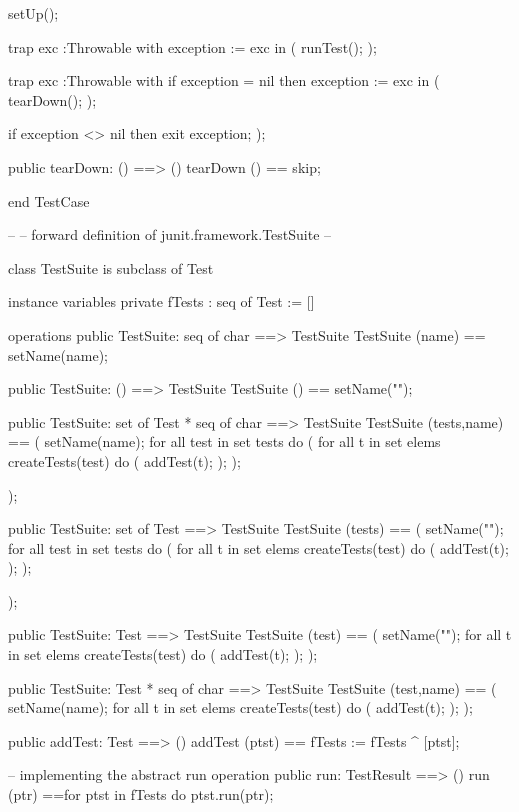 \documentclass[a4paper]{article}
\begin{document}
\begin{vdm_al}
    setUp();
    
    trap exc :Throwable
        with  
            exception := exc
        in
        (
            runTest();
        );

    trap exc :Throwable
        with  
            if exception = nil then
                exception := exc
        in
        (
            tearDown();
        );
        
    if exception <> nil then exit exception;
   );
  
  public tearDown: () ==> ()
  tearDown () == skip;
           
end TestCase

--
-- forward definition of junit.framework.TestSuite
--

class TestSuite is subclass of Test

instance variables
  private fTests : seq of Test := []
  
operations
  public TestSuite: seq of char ==> TestSuite
  TestSuite (name) == setName(name);

  public TestSuite: () ==> TestSuite
  TestSuite () == setName("");

  public TestSuite: set of Test * seq of char ==> TestSuite
  TestSuite (tests,name) == 
  (
    setName(name);
    for all test in set tests do
    (
       for all t in set elems createTests(test) do
       (
         addTest(t); 
       );
    );
    
  );

  public TestSuite: set of Test ==> TestSuite
  TestSuite (tests) == 
  (
    setName("");
    for all test in set tests do
    (
       for all t in set elems createTests(test) do
       (
         addTest(t); 
       );
    );
    
  );

  public TestSuite: Test ==> TestSuite
  TestSuite (test) == 
  (
    setName("");
    for all t in set elems createTests(test) do
     (
       addTest(t); 
     );
  );

  public TestSuite: Test * seq of char ==> TestSuite
  TestSuite (test,name) == 
  (
    setName(name);
    for all t in set elems createTests(test) do
     (
       addTest(t); 
     );
  );
  
  public addTest: Test ==> ()
  addTest (ptst) == fTests := fTests ^ [ptst];
  
  -- implementing the abstract run operation 
  public run: TestResult ==> ()
  run (ptr) ==for ptst in fTests do ptst.run(ptr);


\end{vdm_al}
\end{document}
